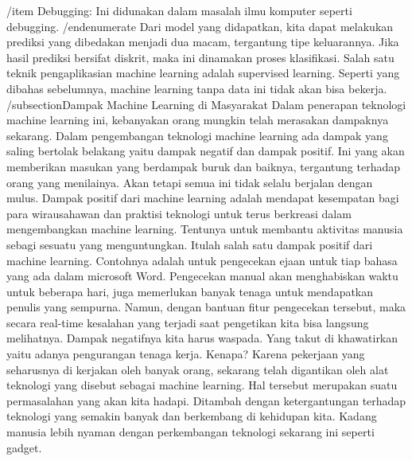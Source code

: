 /item Debugging: Ini didunakan dalam masalah ilmu komputer seperti debugging.
/end{enumerate}
Dari model yang didapatkan, kita dapat melakukan prediksi yang dibedakan menjadi dua macam, tergantung tipe keluarannya. Jika hasil prediksi bersifat diskrit, maka ini dinamakan proses klasifikasi. Salah satu teknik pengaplikasian machine learning adalah supervised learning. Seperti yang dibahas sebelumnya, machine learning tanpa data ini tidak akan bisa bekerja.
/subsection{Dampak Machine Learning di Masyarakat}  
Dalam penerapan teknologi machine learning ini, kebanyakan orang mungkin telah merasakan dampaknya sekarang. Dalam pengembangan teknologi machine learning ada dampak yang saling bertolak belakang yaitu dampak negatif dan dampak positif. Ini yang akan memberikan masukan yang berdampak buruk dan baiknya, tergantung terhadap orang yang menilainya. Akan tetapi semua ini tidak selalu berjalan dengan mulus.
Dampak positif dari machine learning adalah mendapat kesempatan bagi para wirausahawan dan praktisi teknologi untuk terus berkreasi dalam mengembangkan machine learning. Tentunya untuk membantu aktivitas manusia sebagi sesuatu yang menguntungkan. Itulah salah satu dampak positif dari machine learning. Contohnya adalah untuk pengecekan ejaan untuk tiap bahasa yang ada dalam microsoft Word.
Pengecekan manual akan menghabiskan waktu untuk beberapa hari, juga memerlukan banyak tenaga untuk mendapatkan penulis yang sempurna. Namun, dengan bantuan fitur pengecekan tersebut, maka secara real-time kesalahan yang terjadi saat pengetikan kita bisa langsung melihatnya.
Dampak negatifnya kita harus waspada. Yang takut di khawatirkan yaitu adanya pengurangan tenaga kerja. Kenapa? Karena pekerjaan yang seharusnya di kerjakan oleh banyak orang, sekarang telah digantikan oleh alat teknologi yang disebut sebagai machine learning. Hal tersebut merupakan suatu permasalahan yang akan kita hadapi. Ditambah dengan ketergantungan terhadap teknologi yang semakin banyak dan berkembang di kehidupan kita. Kadang manusia lebih nyaman dengan perkembangan teknologi sekarang ini seperti gadget.


